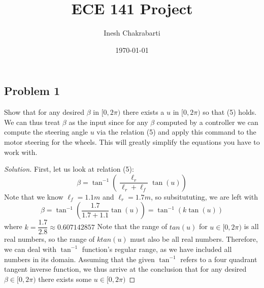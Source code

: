 \documentclass{article}
\title{ECE 141 Project} %
\author{Inesh Chakrabarti} %
\date{\today}
\newcommand{\atan}{\tan^{-1}}
\begin{document}
\maketitle

\subsection*{Problem 1}
Show that for any desired $\beta$ in $[0, 2\pi)$ there exists a $u$ in $[0, 2\pi)$ so that (5) holds. We can thus treat $\beta$ as the input since for any $\beta$ computed by a controller we can compute the steering angle $u$ via the relation (5) and apply this command to the motor steering for the wheels. This will greatly simplify the equations you have to work with.
\begin{proof}[Solution]
First, let us look at relation (5):
\[\beta = \atan\left(\dfrac{\ell_r}{\ell_r+\ell_f}\tan(u)\right)
\]
Note that we know $\ell_f = 1.1m$ and $\ell_r = 1.7m$, so subsitututing, we are left with 
\[\beta = \atan\left(\dfrac{1.7}{1.7+1.1}\tan(u)\right)= \atan(k\tan(u))
\]
where $k=\dfrac{1.7}{2.8} \approx 0.607142857$ \newline
Note that the range of $tan(u)$ for $u \in [0, 2\pi)$ is all real numbers, so the range of $ktan(u)$ must also be all real numbers. Therefore, we can deal with $\atan$ function's regular range, as we have included all numbers in its domain. Assuming that the given $\atan$ refers to a four quadrant tangent inverse function, we thus arrive at the conclusion that for any desired $\beta \in [0, 2\pi)$ there exists some $u \in [0, 2\pi)$
\end{proof}
\end{document}
